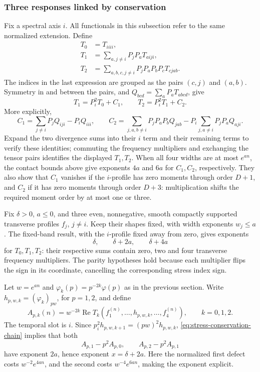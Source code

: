 \subsubsection{Three responses linked by conservation}

Fix a spectral axis $i$. All functionals in this subsection refer to the
same normalized extension. Define
\begin{align*}
 T_0&=T_{iiii},\\
 T_1&=\sum_{a,j\ne i}P_jP_aT_{aiji},\\
 T_2&=\sum_{a,b,c,j\ne i}P_jP_aP_bP_cT_{cj ab}.
\end{align*}
The indices in the last expression are grouped as the pairs $(c,j)$ and
$(a,b)$. Symmetry in and between the pairs, and
$Q_{bcd}=\sum_aP_aT_{abcd}$, give
\begin{equation}\label{eq:stress-conservation-chain}
 T_1=P_i^2T_0+C_1,\qquad T_2=P_i^2T_1+C_2.
\end{equation}
More explicitly,
\[
 C_1=\sum_{j\ne i}P_jQ_{iji}-P_iQ_{iii},\qquad
 C_2=\sum_{j,a,b\ne i}P_jP_aP_bQ_{jab}
                    -P_i\sum_{j,a\ne i}P_jP_aQ_{aji}.
\]
Expand the two divergence sums into their $i$ term and their remaining
terms to verify these identities; commuting the frequency multipliers and
exchanging the tensor pairs identifies the displayed $T_1,T_2$.
When all four widths are at most $e^{an}$, the contact bounds above give
exponents $4a$ and $6a$ for $C_1,C_2$, respectively.
They also show that $C_1$ vanishes if the $i$-profile has zero moments
through order $D+1$, and $C_2$ if it has zero moments through order $D+3$:
multiplication shifts the required moment order by at most one or three.

Fix $\delta>0$, $a\leq0$, and three even, nonnegative, smooth compactly
supported transverse profiles $f_j$, $j\ne i$. Keep their shapes fixed,
with width exponents $w_j\leq a$. The fixed-band result, with the $i$-profile fixed away
from zero, gives exponents
\[
 \delta,\qquad\delta+2a,\qquad\delta+4a
\]
for $T_0,T_1,T_2$: their respective sums contain zero, two and four
transverse frequency multipliers. The parity hypotheses hold because each
multiplier flips the sign in its coordinate, cancelling the corresponding
stress index sign.

Let $w=e^{an}$ and $\varphi_k(p)=p^{-2k}\varphi(p)$ as in the previous
section. Write $h_{p,w,k}=(\varphi_k)_{pw}$, for $p=1,2$, and define
\[
 A_{p,k}(n)=w^{-2k}\operatorname{Re}
       T_k(f_1^{(n)},\ldots,h_{p,w,k},\ldots,f_4^{(n)}),
       \qquad k=0,1,2.
\]
The temporal slot is $i$. Since $p_i^2h_{p,w,k+1}=(pw)^2h_{p,w,k}$,
\eqref{eq:stress-conservation-chain} implies that both
\[
 A_{p,1}-p^2A_{p,0},\qquad A_{p,2}-p^2A_{p,1}
\]
have exponent $2a$, hence exponent $x=\delta+2a$.
Here the normalized first defect costs $w^{-2}e^{4an}$, and the second
costs $w^{-4}e^{6an}$, making the exponent explicit.

